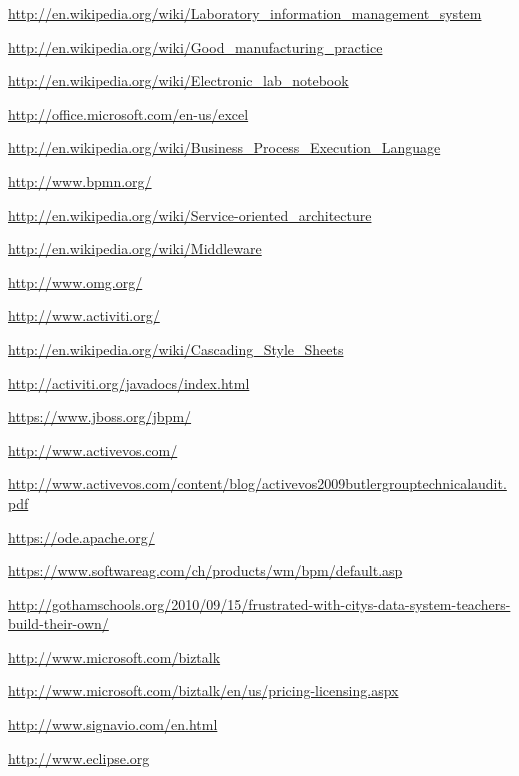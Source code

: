 \documentclass[paper=a4,twoside=false,BCOR=0mm,DIV=calc,fontsize=12pt]{scrartcl}
\begin{document}
\begin{thebibliography}{99}

 \url{http://en.wikipedia.org/wiki/Laboratory_information_management_system}

 \url{}

 \url{http://en.wikipedia.org/wiki/Good_manufacturing_practice}

 \url{http://en.wikipedia.org/wiki/Electronic_lab_notebook}

 \url{http://office.microsoft.com/en-us/excel}

 \url{http://en.wikipedia.org/wiki/Business_Process_Execution_Language}

 \url{http://www.bpmn.org/}

 \url{http://en.wikipedia.org/wiki/Service-oriented_architecture}

 \url{http://en.wikipedia.org/wiki/Middleware}

 \url{http://www.omg.org/}

 \url{http://www.activiti.org/}

 \url{http://en.wikipedia.org/wiki/Cascading_Style_Sheets}

 \url{http://activiti.org/javadocs/index.html}

 \url{https://www.jboss.org/jbpm/}

 \url{http://www.activevos.com/}

 \url{http://www.activevos.com/content/blog/activevos2009butlergrouptechnicalaudit.pdf}

 \url{https://ode.apache.org/}

 \url{https://www.softwareag.com/ch/products/wm/bpm/default.asp}

 \url{http://gothamschools.org/2010/09/15/frustrated-with-citys-data-system-teachers-build-their-own/}

 \url{http://www.microsoft.com/biztalk}

 \url{http://www.microsoft.com/biztalk/en/us/pricing-licensing.aspx}

 \url{http://www.signavio.com/en.html}

 \url{http://www.eclipse.org} %


\end{thebibliography}
\end{document}
